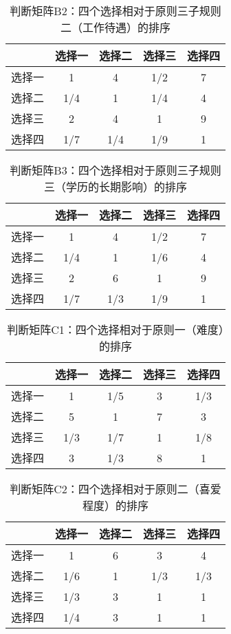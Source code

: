 \documentclass[UTF8]{ctexart}
\begin{document}
\begin{table}[!hbp]
\centering
\begin{tabular}{|c|c|c|c|c|}
\hline
\hline
      & 选择一 & 选择二 & 选择三 & 选择四 \\
\hline
选择一 & 1     & 4     & 1/2   & 7     \\
\hline
选择二 & 1/4   & 1     & 1/4   & 4     \\
\hline
选择三 & 2     & 4     & 1     & 9     \\
\hline
选择四 & 1/7   & 1/4   & 1/9   & 1     \\
\hline
\end{tabular}
\caption{判断矩阵B2：四个选择相对于原则三子规则二（工作待遇）的排序}
\vspace{4mm}
\end{table}
\begin{table}[!hbp]
\centering
\begin{tabular}{|c|c|c|c|c|}
\hline
\hline
      & 选择一 & 选择二 & 选择三 & 选择四 \\
\hline
选择一 & 1     & 4     & 1/2   & 7     \\
\hline
选择二 & 1/4   & 1     & 1/6   & 4     \\
\hline
选择三 & 2     & 6     & 1     & 9     \\
\hline
选择四 & 1/7   & 1/3   & 1/9   & 1     \\
\hline
\end{tabular}
\caption{判断矩阵B3：四个选择相对于原则三子规则三（学历的长期影响）的排序}
\vspace{4mm}
\end{table}
\begin{table}[!hbp]
\centering
\begin{tabular}{|c|c|c|c|c|}
\hline
\hline
      & 选择一 & 选择二 & 选择三 & 选择四 \\
\hline
选择一 & 1     & 1/5   & 3     & 1/3   \\
\hline
选择二 & 5     & 1     & 7     & 3     \\
\hline
选择三 & 1/3   & 1/7   & 1     & 1/8   \\
\hline
选择四 & 3     & 1/3   & 8     & 1     \\
\hline
\end{tabular}
\caption{判断矩阵C1：四个选择相对于原则一（难度）的排序}
\vspace{4mm}
\end{table}
\begin{table}[!hbp]
\centering
\begin{tabular}{|c|c|c|c|c|}
\hline
\hline
      & 选择一 & 选择二 & 选择三 & 选择四 \\
\hline
选择一 & 1     & 6     & 3     & 4     \\
\hline
选择二 & 1/6   & 1     & 1/3   & 1/3   \\
\hline
选择三 & 1/3   & 3     & 1     & 1     \\
\hline
选择四 & 1/4   & 3     & 1     & 1     \\
\hline
\end{tabular}
\caption{判断矩阵C2：四个选择相对于原则二（喜爱程度）的排序}
\vspace{4mm}
\end{table}
\end{document}
